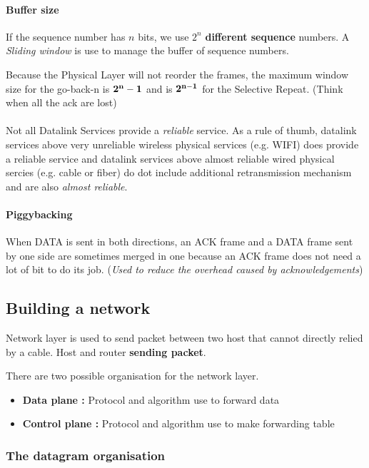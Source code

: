 \paragraph{Buffer size}
If the sequence number has $n$ bits, we use $2^n$ \textbf{different sequence} numbers.
A \textit{Sliding window} is use to manage the buffer of sequence numbers.

Because the Physical Layer will not reorder the frames,
the maximum window size for the go-back-n is $\bf 2^n-1$ and is $\bf 2^{n-1}$ for the Selective Repeat. 
(Think when all the ack are lost)

\paragraph{  }  Not  all  Datalink Services  provide  a  \emph{reliable}
service. As  a rule  of thumb, datalink  services above  very unreliable
wireless physical services  (e.g. WIFI) does provide  a reliable service
and datalink services above almost reliable wired physical sercies (e.g.
cable or fiber)  do dot include additional  retransmission mechanism and
are also \emph{almost reliable}.

\paragraph{Piggybacking}
When DATA is sent in both directions, an ACK frame and a DATA frame sent by one side are sometimes merged in one because an ACK frame does not need a lot of bit to do its job.
(\textit{Used to reduce the overhead caused by acknowledgements})




\subsection{Building a network}
Network layer is used to send packet between two host that cannot directly relied
by a cable. Host and router \textbf{sending packet}.

There are two possible organisation for the network layer.

\begin{itemize}
    \item \textbf{Data plane :} Protocol and algorithm use to forward data
    \item \textbf{Control plane :} Protocol and algorithm use to make forwarding table
\end{itemize}

\subsubsection{The datagram organisation}

